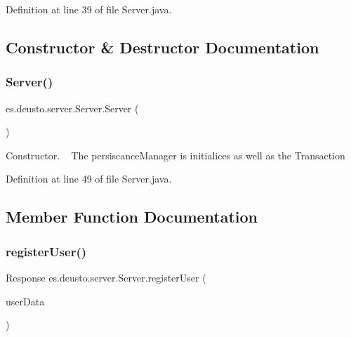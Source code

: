 Definition at line 39 of file Server.\+java.



\subsection{Constructor \& Destructor Documentation}
\mbox{\label{classes_1_1deusto_1_1server_1_1_server_a84f78162a65dd737f224eb2f94c43023}} 
\subsubsection{\texorpdfstring{Server()}{Server()}}
{\footnotesize\ttfamily es.\+deusto.\+server.\+Server.\+Server (\begin{DoxyParamCaption}{ }\end{DoxyParamCaption})}

Constructor. ~\newline
The persiscance\+Manager is initialices as well as the Transaction 

Definition at line 49 of file Server.\+java.



\subsection{Member Function Documentation}
\mbox{\label{classes_1_1deusto_1_1server_1_1_server_a12f56d7a970c3c41fefe8ed2db835c0a}} 
\subsubsection{\texorpdfstring{register\+User()}{registerUser()}}
{\footnotesize\ttfamily Response es.\+deusto.\+server.\+Server.\+register\+User (\begin{DoxyParamCaption}\item[{\hyperlink{classes_1_1deusto_1_1serialization_1_1_user_data}{User\+Data}}]{user\+Data }\end{DoxyParamCaption})}

